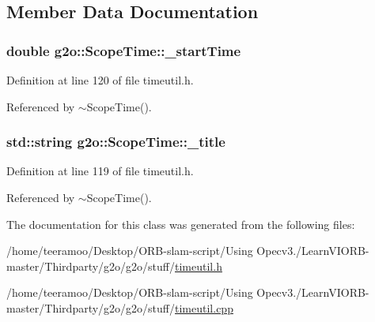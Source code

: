 \subsection{Member Data Documentation}
\subsubsection[{\texorpdfstring{\+\_\+start\+Time}{_startTime}}]{\setlength{\rightskip}{0pt plus 5cm}double g2o\+::\+Scope\+Time\+::\+\_\+start\+Time\hspace{0.3cm}{\ttfamily [private]}}\hypertarget{classg2o_1_1ScopeTime_ac9bcaa9a2dfbe09b98de1e7dd664433f}{}\label{classg2o_1_1ScopeTime_ac9bcaa9a2dfbe09b98de1e7dd664433f}


Definition at line 120 of file timeutil.\+h.



Referenced by $\sim$\+Scope\+Time().

\subsubsection[{\texorpdfstring{\+\_\+title}{_title}}]{\setlength{\rightskip}{0pt plus 5cm}std\+::string g2o\+::\+Scope\+Time\+::\+\_\+title\hspace{0.3cm}{\ttfamily [private]}}\hypertarget{classg2o_1_1ScopeTime_a6ee3cc8fa420b9963ad5198212c4a8b9}{}\label{classg2o_1_1ScopeTime_a6ee3cc8fa420b9963ad5198212c4a8b9}


Definition at line 119 of file timeutil.\+h.



Referenced by $\sim$\+Scope\+Time().



The documentation for this class was generated from the following files\+:\begin{DoxyCompactItemize}
\item 
/home/teeramoo/\+Desktop/\+O\+R\+B-\/slam-\/script/\+Using Opecv3./\+Learn\+V\+I\+O\+R\+B-\/master/\+Thirdparty/g2o/g2o/stuff/\hyperlink{timeutil_8h}{timeutil.\+h}\item 
/home/teeramoo/\+Desktop/\+O\+R\+B-\/slam-\/script/\+Using Opecv3./\+Learn\+V\+I\+O\+R\+B-\/master/\+Thirdparty/g2o/g2o/stuff/\hyperlink{timeutil_8cpp}{timeutil.\+cpp}\end{DoxyCompactItemize}
